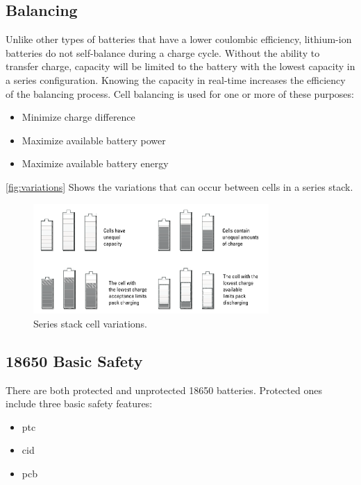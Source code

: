 \subsection{Balancing}
Unlike other types of batteries that have a lower coulombic efficiency, lithium-ion batteries do not self-balance during a charge cycle. Without the ability to transfer charge, capacity will be limited to the battery with the lowest capacity in a series configuration. Knowing the capacity in real-time increases the efficiency of the balancing process.
Cell balancing is used for one or more of these purposes\cite[p.183-185]{book}:

\begin{itemize}[noitemsep]
	\item Minimize charge difference
	\item Maximize available battery power
	\item Maximize available battery energy
\end{itemize}

\autoref{fig:variations} Shows the variations that can occur between cells in a series stack.

\begin{figure}[H]
	\centering
	\includegraphics[width=0.8\textwidth]{Figures/variations.png} 
	\caption{Series stack cell variations.}
	\label{fig:variations}
\end{figure}

\subsection{18650 Basic Safety}
There are both protected and unprotected 18650 batteries. Protected ones include three basic safety features\cite{webpage}:

\begin{itemize}[noitemsep]
	\item \gls{ptc}
	\item \gls{cid}
	\item \gls{pcb}
\end{itemize}

